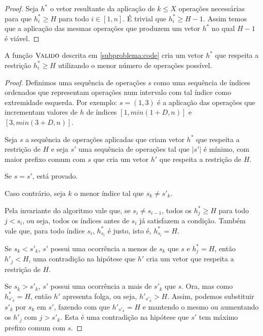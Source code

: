 \begin{proof}
    Seja $h^*$ o vetor resultante da aplicação de $k \leq X$ operações necessárias para que $h^*_i \geq H$ para todo $i \in [1, n]$. É trivial que $h^*_i \geq H - 1$. Assim temos que a aplicação das mesmas operações que produzem um vetor $h^*$ no qual $H - 1$ é viável.
\end{proof}

\begin{prop}
    A função $\textsc{Valido}$ descrita em \ref{subproblema:code} cria um vetor $h^*$ que respeita a restrição $h^*_i \geq H$ utilizando o menor número de operações possível.
\end{prop}

\begin{proof}
    Definimos uma sequência de operações $s$ como uma sequência de índices ordenados que representam operações num intervalo com tal índice como extremidade esquerda. Por exemplo: $s = (1, 3)$ é a aplicação das operações que incrementam valores de $h$ de índices $[1, min(1 + D, n)]$ e $[3, min(3 + D, n)]$.
    
    Seja $s$ a sequência de operações aplicadas que criam vetor $h^*$ que respeita a restrição de $H$ e seja $s'$ uma sequência de operações tal que $|s'|$ é mínimo, com maior prefixo comum com $s$ que cria um vetor $h'$ que respeita a restrição de $H$.
    
    Se $s = s'$, está provado.

    Caso contrário, seja $k$ o menor índice tal que $s_k \neq s'_k$.

    Pela invariante do algoritmo vale que, se $s_i \neq s_{i - 1}$, todos os $h^*_j \geq H$ para todo $j < s_i$, ou seja, todos os índices antes de $s_i$ já satisfazem a condição. Também vale que, para todo índice $s_i$, $h^*_{s_i}$ é justo, isto é, $h^*_{s_i} = H$.

    Se $s_k < s'_k$, $s'$ possui uma ocorrência a menos de $s_k$ que $s$ e $h^*_j = H$, então $h'_j < H$, uma contradição na hipótese que $h'$ cria um vetor que respeita a restrição de $H$.

    Se $s_k > s'_k$, $s'$ possui uma ocorrência a mais de $s'_k$ que $s$. Ora, mas como $h^*_{s'_k} = H$, então $h'$ apresenta folga, ou seja, $h'_{s'_k} > H$. Assim, podemos substituir $s'_k$ por $s_k$ em $s'$, fazendo com que $h'_{s'_k} = H$ e mantendo o mesmo ou aumentando os $h'_j$ com $j > s'_k$. Esta é uma contradição na hipótese que $s'$ tem máximo prefixo comum com $s$.

\end{proof}

